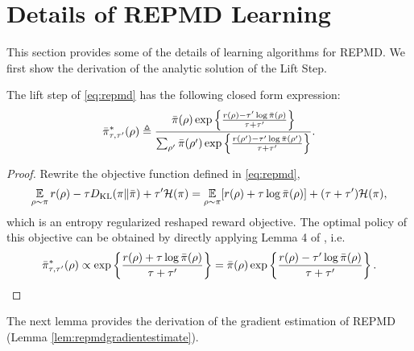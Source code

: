 \section{Details of REPMD Learning}
\label{appx:repmd-learning}

This section provides some of the details of learning algorithms for REPMD.
We first show the derivation of the analytic solution of the Lift Step.
\begin{lem}
	\label{lem:opt_pi_ref}
	The lift step of \cref{eq:repmd} has the following closed form expression:
	\begin{equation}
	\label{eq:pitautauprime}
	\bar{\pi}_{\tau,\tau^{\prime}}^*(\rho) \triangleq \frac{\bar{\pi}(\rho) \exp\left\{ \frac{r(\rho)-\tau^{\prime} \log \bar{\pi}(\rho) }{ \tau+\tau^{\prime}} \right\}}{ \sum_{\rho^{\prime}}{\bar{\pi}(\rho^{\prime}) \exp\left\{ \frac{r(\rho^{\prime})-\tau^{\prime} \log \bar{\pi}(\rho^{\prime})}{ \tau+\tau^{\prime}} \right\} } }.
	\end{equation}
\end{lem}
\begin{proof}
	Rewrite the objective function defined in \cref{eq:repmd},
	\begin{equation}
	\operatorname*{\mathbb{E}}\limits_{\rho \sim \pi} r(\rho)  - \tau D_{\mathrm{KL}}(\pi \| \bar{\pi}) + \tau^{\prime} \mathcal{H}(\pi) = \operatorname*{\mathbb{E}}\limits_{\rho \sim \pi} [r(\rho) + \tau \log \bar{\pi}(\rho)] + (\tau+\tau^{\prime}) \mathcal{H}(\pi),
	\end{equation}
	which is an entropy regularized reshaped reward objective. The optimal policy of this objective can be obtained by directly applying Lemma 4 of \citet{nachum2017bridging}, i.e.
	\begin{equation}
	\label{pi_bar_star_tau_tauprime_prop_form}
	\bar{\pi}_{\tau,\tau^{\prime}}^*(\rho)\propto \exp\left\{ \frac{r(\rho)+\tau \log \bar{\pi}(\rho)}{\tau+\tau^{\prime}} \right\} = \bar{\pi}(\rho) \exp\left\{ \frac{r(\rho)-\tau^{\prime} \log \bar{\pi}(\rho)}{\tau+\tau^{\prime}} \right\}. \qedhere
	\end{equation}
\end{proof}
The next lemma provides the derivation of the gradient estimation of REPMD (Lemma \ref{lem:repmdgradientestimate}). 
